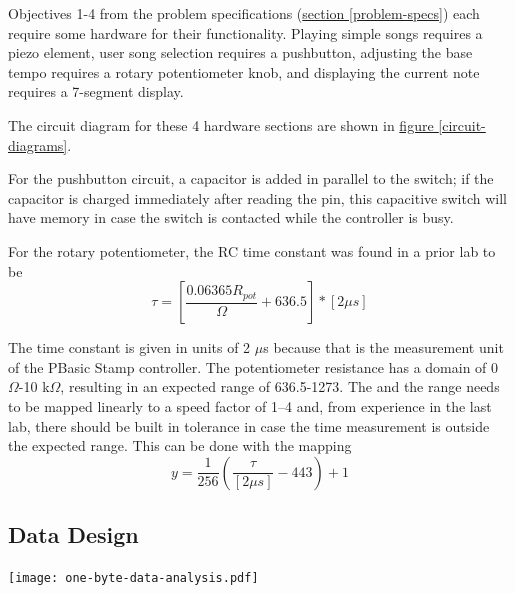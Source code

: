 \documentclass[11pt]{article}
\begin{document}
Objectives 1-4 from the problem specifications (\hyperref[problem-specs]{section \ref{problem-specs}})
each require some hardware for their functionality.
Playing simple songs requires a piezo element, user song selection requires a pushbutton,
adjusting the base tempo requires a rotary potentiometer knob, and
displaying the current note requires a 7-segment display.

The circuit diagram for these 4 hardware sections are shown in
\hyperref[circuit-diagrams]{figure \ref{circuit-diagrams}}. 

For the pushbutton circuit, a capacitor is added in parallel to the switch;
if the capacitor is charged immediately after reading the pin, this capacitive
switch will have memory in case the switch is contacted while the controller
is busy.

For the rotary potentiometer, the RC time constant was found in a prior lab to be
\begin{equation}
\tau = \left[ \frac{0.06365R_{pot}}{\Omega}+636.5 \right] *[2\mu s]
\end{equation}

The time constant is given in units of 2 $\mu$s because that is the measurement
unit of the PBasic Stamp controller. The potentiometer resistance has a domain
of 0 $\Omega$-10 k$\Omega$, resulting in an expected range of 636.5-1273.
The and the range needs to be mapped linearly to a
speed factor of 1--4 and, from experience in the last lab, there should be built in
tolerance in case the time measurement is outside the expected range.
This can be done with the mapping
\begin{equation}
y=\frac{1}{256}\left( \frac{\tau}{[2\mu s]}-443 \right) +1
\end{equation}

\subsection{Data Design}

\begin{center}
\texttt{[image: one-byte-data-analysis.pdf]}
\label{one-byte-data-breakdown}
\end{center}
\end{document}
